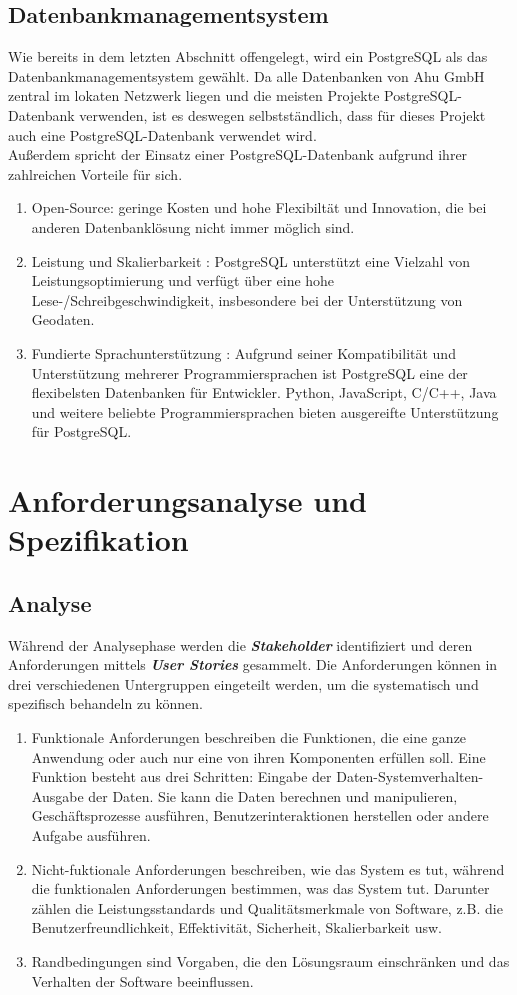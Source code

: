 \documentclass[a4paper,12pt]{scrreprt}
\begin{document}
\section{Datenbankmanagementsystem}
Wie bereits in dem letzten Abschnitt offengelegt, wird ein PostgreSQL als das Datenbankmanagementsystem gewählt. 
Da alle Datenbanken von Ahu GmbH zentral im lokaten Netzwerk liegen und die meisten Projekte PostgreSQL-Datenbank verwenden, ist es deswegen selbstständlich, dass für dieses Projekt auch eine PostgreSQL-Datenbank verwendet wird. \\
Außerdem spricht der Einsatz einer PostgreSQL-Datenbank aufgrund ihrer zahlreichen Vorteile für sich.
\begin{enumerate}
\item Open-Source: geringe Kosten und hohe Flexibiltät und Innovation, die bei anderen Datenbanklösung nicht immer möglich sind. 
\item Leistung und Skalierbarkeit : PostgreSQL unterstützt eine Vielzahl von Leistungsoptimierung und verfügt über eine hohe Lese-/Schreibgeschwindigkeit, insbesondere bei der Unterstützung von Geodaten.
\item Fundierte Sprachunterstützung : Aufgrund seiner Kompatibilität und Unterstützung mehrerer Programmiersprachen ist PostgreSQL eine der flexibelsten Datenbanken für Entwickler. Python, JavaScript, C/C++, Java und weitere beliebte Programmiersprachen bieten ausgereifte Unterstützung für PostgreSQL.
\end{enumerate}

\chapter{Anforderungsanalyse und Spezifikation }
\section{Analyse}
Während der Analysephase werden die \textbf{\textit{Stakeholder}} identifiziert und deren Anforderungen mittels \textbf{\textit{User Stories}} gesammelt. Die Anforderungen können in drei verschiedenen Untergruppen eingeteilt werden, um die systematisch und spezifisch behandeln zu können.
\begin{enumerate}
\item Funktionale Anforderungen beschreiben die Funktionen, die eine ganze Anwendung oder auch nur eine von ihren Komponenten erfüllen soll. Eine Funktion besteht aus drei Schritten: Eingabe der Daten-Systemverhalten-Ausgabe der Daten. Sie kann die Daten berechnen und manipulieren, Geschäftsprozesse ausführen, Benutzerinteraktionen herstellen oder andere Aufgabe ausführen.
\item Nicht-fuktionale Anforderungen beschreiben, wie das System es tut, während die funktionalen Anforderungen bestimmen, was das System tut. Darunter zählen die Leistungsstandards und Qualitätsmerkmale von Software, z.B. die Benutzerfreundlichkeit, Effektivität, Sicherheit, Skalierbarkeit usw.
\item Randbedingungen sind Vorgaben, die den Lösungsraum einschränken und das Verhalten der Software beeinflussen.
\end{enumerate}
\end{document}
